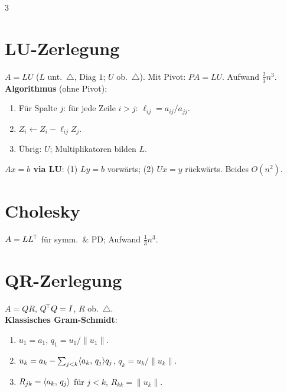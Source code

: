 \documentclass[8pt,a4paper]{extarticle}
\begin{document}
\begin{multicols*}{3}
\section{LU-Zerlegung}
$A=LU$ ($L$ unt.\ $\triangle$, Diag $1$; $U$ ob.\ $\triangle$). Mit Pivot: $PA=LU$. Aufwand $\tfrac23 n^3$.\\
\textbf{Algorithmus} (ohne Pivot):
\begin{enumerate}
\item F\"ur Spalte $j$: f\"ur jede Zeile $i>j$: $\ell_{ij}=a_{ij}/a_{jj}$.
\item $Z_i\leftarrow Z_i-\ell_{ij}Z_j$.
\item \"Ubrig: $U$; Multiplikatoren bilden $L$.
\end{enumerate}
\textbf{$Ax=b$ via LU}: (1) $Ly=b$ vorw\"arts; (2) $Ux=y$ r\"uckw\"arts. Beides $O(n^2)$.

\section{Cholesky}
$A=LL^{\!\top}$ f\"ur symm.\ \& PD; Aufwand $\tfrac13 n^3$.

\section{QR-Zerlegung}
$A=QR$, $Q^{\!\top} Q=I$, $R$ ob.\ $\triangle$.\\
\textbf{Klassisches Gram-Schmidt}:
\begin{enumerate}
\item $u_1=a_1$, $q_1=u_1/\|u_1\|$.
\item $u_k=a_k-\sum_{j<k}\langle a_k,\,q_j\rangle q_j$, $q_k=u_k/\|u_k\|$.
\item $R_{jk}=\langle a_k,\,q_j\rangle$ f\"ur $j<k$, $R_{kk}=\|u_k\|$.
\end{enumerate}


\end{multicols*}
\end{document}
